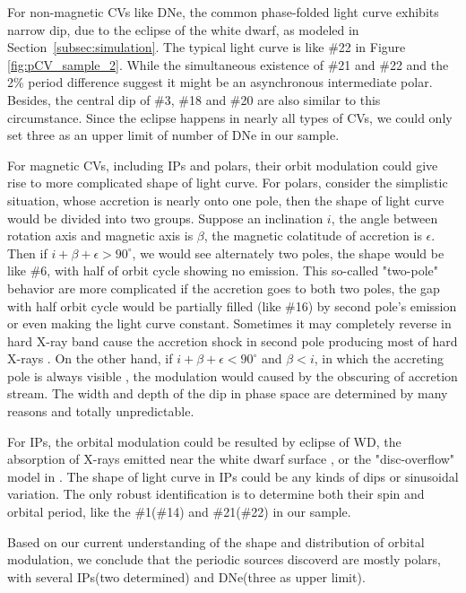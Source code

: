 \documentclass[fleqn,usenatbib]{mnras}
\begin{document}
For non-magnetic CVs like DNe, the common phase-folded light curve exhibits narrow dip, due to the eclipse of the white dwarf, as modeled in Section~\ref{subsec:simulation}. The typical light curve is like \#22 in Figure \ref{fig:pCV_sample_2}. 	While the simultaneous existence of \#21 and \#22 and the 2\% period difference suggest it might be an asynchronous intermediate polar. Besides, the central dip of \#3, \#18 and \#20 are also similar to this circumstance. Since the eclipse happens in nearly all types of CVs, we could only set three as an upper limit of number of DNe in our sample.

For magnetic CVs, including IPs and polars, their orbit modulation could give rise to more complicated shape of light curve. For polars, consider the simplistic situation, whose accretion is nearly onto one pole, then the shape of light curve would be divided into two groups. Suppose an inclination $i$, the angle between rotation axis and magnetic axis is $\beta$, the magnetic colatitude of accretion is $\epsilon$. Then if $i+\beta+\epsilon > 90^{\circ}$, we would see alternately two poles, the shape would be like \#6, with half of orbit cycle showing no emission. This so-called "two-pole"  behavior are more complicated if the accretion goes to both two poles, the gap with half orbit cycle would be partially filled (like \#16) by second pole's emission or even making the light curve constant. Sometimes it may completely reverse in hard X-ray band cause the accretion shock in second pole producing most of hard X-rays \citep{1985A&A...148L..14H}. On the other hand, if $i+\beta+\epsilon < 90^{\circ}$ and $\beta < i$, in which the accreting pole is always visible , the modulation would caused by the obscuring of accretion stream. The width and depth of the dip in phase space are determined by many reasons and totally unpredictable. 

For IPs, the orbital modulation could be resulted by eclipse of WD, the absorption of X-rays emitted near the white
dwarf surface \citep{1993MNRAS.260..299H}, or the "disc-overflow" model in \citep{1996MNRAS.280..937N}. The shape of light curve in IPs could be any kinds of dips or sinusoidal variation. The only robust identification is to determine both their spin and orbital period, like the \#1(\#14) and \#21(\#22) in our sample.

Based on our current understanding of the shape and distribution of orbital modulation, we conclude that the periodic sources discoverd are mostly polars, with several IPs(two determined) and DNe(three as upper limit). 
\end{document}
